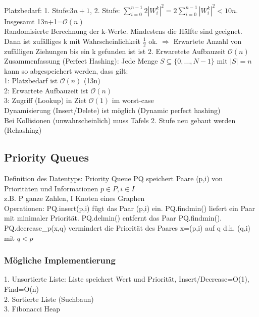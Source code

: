 \documentclass[a4paper]{article}
\newcommand{\oh}[1]{$\mathcal{O}(#1)$}
\begin{document}
Platzbedarf: 1. Stufe:$3n+1$, 2. Stufe: $\sum_{i=0}^{n-1}2|W_i^k|^2 = 2\sum_{i=0}^{n-1}|W_i^k|^2 < 10n$. Insgesamt 13n+1=\oh{n}\\
Randomisierte Berechnung der k-Werte. Mindestens die Hälfte sind geeignet. Dann ist zufälliges k mit Wahrscheinlichkeit $\frac{1}{2}$ ok. $\Rightarrow$ Erwartete Anzahl von zufälligen Ziehungen bis ein k gefunden ist ist 2. Erwaretete Aufbauzeit \oh{n}\\
Zusammenfassung (Perfect Hashing): Jede Menge $S\subseteq \{0,...,N-1\}$ mit $|S|=n$ kann so abgespeichert werden, dass gilt:\\
\hspace*{1cm}1: Platzbedarf ist \oh{n} (13n)\\
\hspace*{1cm}2: Erwartete Aufbauzeit ist \oh{n}\\
\hspace*{1cm}3: Zugriff (Lookup) in Ziet \oh{1} im worst-case\\
Dynamisierung (Insert/Delete) ist möglich (Dynamic perfect hashing)\\
Bei Kollisionen (unwahrscheinlich) muss Tafels 2. Stufe neu gebaut werden (Rehashing)\\
\subsection{Priority Queues}
Definition des Datentyps: Priority Queue PQ speichert Paare (p,i) von Prioritäten und Informationen $p\in P, i\in I$\\
z.B. P ganze Zahlen, I Knoten eines Graphen\\
Operationen: PQ.insert(p,i) fügt das Paar (p,i) ein. PQ.findmin() liefert ein Paar mit minimaler Priorität. PQ.delmin() entfernt das Paar PQ.findmin(). PQ.decrease\_p(x,q) vermindert die Priorität des Paares x=(p,i) auf q d.h. (q,i) mit $q<p$\\
\subsubsection{Mögliche Implementierung}
1. Unsortierte Liste: Liste speichert Wert und Priorität, Insert/Decrease=O(1), Find=O(n)\\
2. Sortierte Liste (Suchbaun)\\
3. Fibonacci Heap\\
\end{document}
